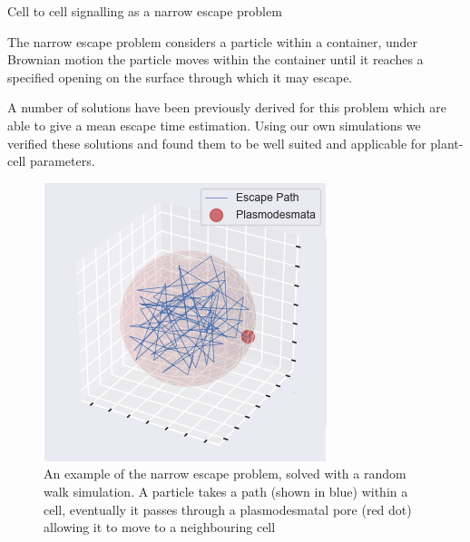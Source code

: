 \documentclass[final]{beamer}
\begin{document}
\begin{frame}{}
\begin{textblock}{28}
\begin{block}{Cell to cell signalling as a narrow escape problem}
\begin{multicols}{2}
        \vspace{1cm}

        The narrow escape problem considers a particle within a
        container, under Brownian motion the particle moves within the
        container until it reaches a specified opening on the surface
        through which it may escape.


        \vspace{1cm}

        A number of solutions have been previously derived for this
        problem which are able to give a mean escape time
        estimation. Using our own simulations we verified these
        solutions and found them to be well suited and applicable for
        plant-cell parameters.

        \columnbreak


      \begin{figure}[!ht]
        \centering
          \includegraphics[width=0.9\columnwidth]{./figures/escape_example.png}
        \caption[Narrow Escape Example]{An example of the narrow
          escape problem, solved with a random walk simulation. A
          particle takes a path (shown in blue) within a cell,
          eventually it passes through a plasmodesmatal pore (red dot)
          allowing it to move to a neighbouring cell}
        \label{fig:nepfig}
      \end{figure}
    \end{multicols}
    \end{block}


\end{textblock}
\end{frame}
\end{document}
